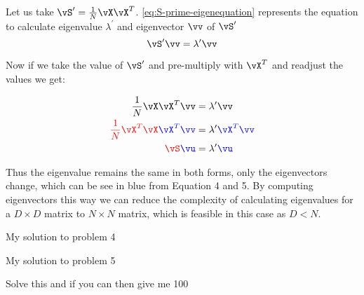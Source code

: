 \documentclass[a4paper,11pt]{article}
\begin{document}
\begin{mlsolution}

Let us take $\vS^{\prime}=\frac{1}{N}\vX\vX^T$. \ref{eq:S-prime-eigenequation} represents the equation to calculate eigenvalue $\lambda^{\prime}$ and eigenvector $\vv$ of $\vS^{\prime}$
\begin{equation}
    \vS^{\prime} \vv = \lambda^{\prime} \vv
    \label{eq:S-prime-eigenequation}
\end{equation}

Now if we take the value of $\vS^{\prime}$ and pre-multiply with $\vX^T$ and readjust the values we get:

\begin{align}
    \frac{1}{N}\vX\vX^T\vv &= \lambda^{\prime} \vv \\
    \red{\frac{1}{N}\vX^T\vX}\blue{\vX^T\vv} &= \lambda^{\prime} \blue{\vX^T \vv} \\
    \red{\vS} \blue{\vu} &= \lambda^{\prime} \blue{\vu}
\end{align}

Thus the eigenvalue remains the same in both forms, only the eigenvectors change, which can be see in blue from Equation 4 and 5. By computing eigenvectors this way we can reduce the complexity of calculating eigenvalues for a $D\times D$ matrix to $N\times N$ matrix, which is feasible in this case as $D<N$.

\end{mlsolution}

\begin{mlsolution}

My solution to problem 4

\end{mlsolution}
	
\begin{mlsolution}

My solution to problem 5

\end{mlsolution}

\begin{mlsolution}

Solve this and if you can then give me 100

\end{mlsolution}
\end{document}
